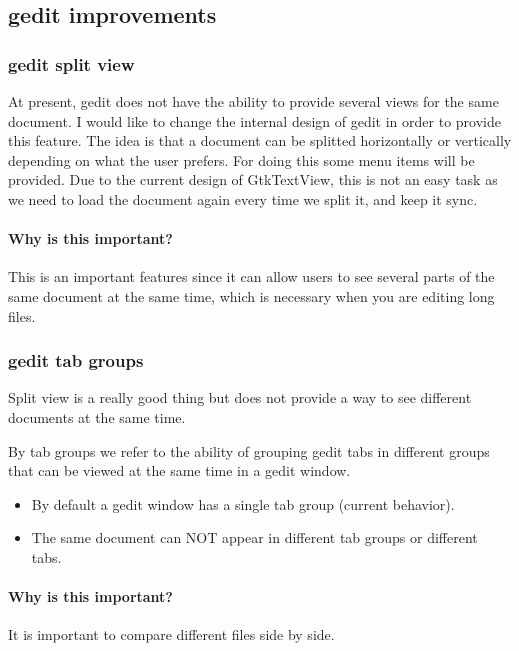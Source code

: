 \subsection*{gedit improvements}

\subsubsection*{gedit split view}

At present, gedit does not have the ability to provide several views for the same document. I would like to change the internal design of gedit in order to provide this feature. The idea is that a document can be splitted horizontally or vertically depending on what the user prefers. For doing this some menu items will be provided.  Due to the current design of GtkTextView,  this is not an easy task as we need to load the document again every time we split it, and keep it sync.

\paragraph{Why is this important?}

This is an important features since it can allow users to see several parts of the same document at the same time, which is necessary when you are editing long files.

\subsubsection*{gedit tab groups}

Split view is a really good thing but does not provide a way to see different documents at the same time.

By tab groups we refer to the ability of grouping gedit tabs in different groups that can be viewed at the same time in a gedit window.
\begin{itemize}
  \item By default a gedit window has a single tab group (current behavior).
  \item The same document can NOT appear in different tab groups or different tabs.
\end{itemize}

\paragraph{Why is this important?}

It is important to compare different files side by side.

